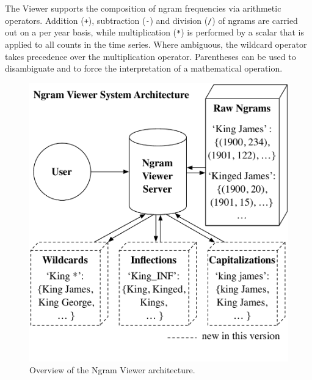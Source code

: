 \documentclass[11pt,a4paper]{article}
\newcommand{\query}[1]{\texttt{#1}}
\begin{document}
The Viewer supports the composition of ngram frequencies via arithmetic operators. Addition (\query{+}), subtraction (\query{-}) and division (\query{/}) of ngrams are carried out on a per year basis, while multiplication (\query{*}) is performed by a scalar that is applied to all counts in the time series. Where ambiguous, the wildcard operator takes precedence over the multiplication operator. Parentheses can be used to disambiguate and to force the interpretation of a mathematical operation.

\begin{figure}[!t]
\includegraphics[width=\columnwidth,keepaspectratio=true]{system_architecture}
\vspace*{-3em}
\caption{\label{fig:architecture}Overview of the Ngram Viewer architecture.}
\end{figure}
\end{document}
